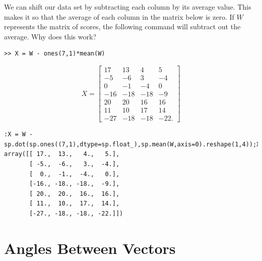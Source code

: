 We can shift our data set by subtracting each column by its average value.  This makes it so that the average of each column in the matrix below is zero.  If $W$ represents the matrix of scores, the following \ProgrammingLanguage command will subtract out the average.  Why does this work?
\begin{matlab}
\begin{lstlisting}[style=matlab]
>> X = W - ones(7,1)*mean(W)
\end{lstlisting}
\[
X=
\begin{bmatrix}
17 & 13 & 4 & 5 \\
-5 & -6 & 3 & -4 \\
0 & -1 & -4 & 0 \\
-16 & -18 & -18 & -9 \\
20 & 20 & 16 & 16 \\
11 & 10 & 17 & 14 \\
-27 & -18 & -18 & -22.
\end{bmatrix}
\]
\end{matlab}
\begin{python}
\begin{lstlisting}[style=python]
:X = W - sp.dot(sp.ones((7,1),dtype=sp.float_),sp.mean(W,axis=0).reshape(1,4));X
array([[ 17.,  13.,   4.,   5.],
       [ -5.,  -6.,   3.,  -4.],
       [  0.,  -1.,  -4.,   0.],
       [-16., -18., -18.,  -9.],
       [ 20.,  20.,  16.,  16.],
       [ 11.,  10.,  17.,  14.],
       [-27., -18., -18., -22.]])
\end{lstlisting}
\end{python}

\section*{Angles Between Vectors}

